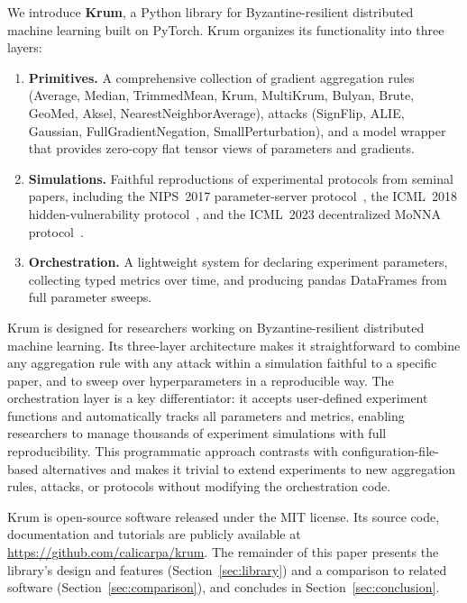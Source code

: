 \documentclass[twoside,11pt]{article}
\begin{document}
We introduce {\bf Krum}, a Python library for Byzantine-resilient
distributed machine learning built on PyTorch.  Krum organizes its
functionality into three layers:
\begin{enumerate}
  \item {\bf Primitives.} A comprehensive collection of gradient
    aggregation rules (Average, Median, TrimmedMean, Krum, MultiKrum,
    Bulyan, Brute, GeoMed, Aksel, NearestNeighborAverage), attacks
    (SignFlip, ALIE, Gaussian, FullGradientNegation, SmallPerturbation),
    and a model wrapper that provides zero-copy flat tensor views of
    parameters and gradients.
  \item {\bf Simulations.} Faithful reproductions of experimental
    protocols from seminal papers, including the NIPS~2017
    parameter-server protocol~\cite{blanchard2017machine}, the ICML~2018
    hidden-vulnerability protocol~\cite{elmhamdi2018hidden}, and the
    ICML~2023 decentralized MoNNA protocol~\cite{farhadkhani2023monna}.
  \item {\bf Orchestration.} A lightweight system for declaring
    experiment parameters, collecting typed metrics over time, and
    producing pandas DataFrames from full parameter sweeps. 
\end{enumerate}
Krum is designed for researchers working on Byzantine-resilient
distributed machine learning.  Its three-layer architecture makes it
straightforward to combine any aggregation rule with any attack within a
simulation faithful to a specific paper, and to sweep over
hyperparameters in a reproducible way. The orchestration layer is a key differentiator: it accepts user-defined experiment functions and automatically tracks all parameters and metrics, enabling researchers to manage thousands of experiment simulations with full reproducibility. This programmatic approach contrasts with configuration-file-based alternatives and makes it trivial to extend experiments to new aggregation rules, attacks, or protocols without modifying the orchestration code.

Krum is open-source software released under the MIT license.  Its source
code, documentation and tutorials are publicly available at
\url{https://github.com/calicarpa/krum}.  The remainder of this paper
presents the library's design and features
(Section~\ref{sec:library}) and a comparison to related software
(Section~\ref{sec:comparison}), and concludes in
Section~\ref{sec:conclusion}.

\end{document}
